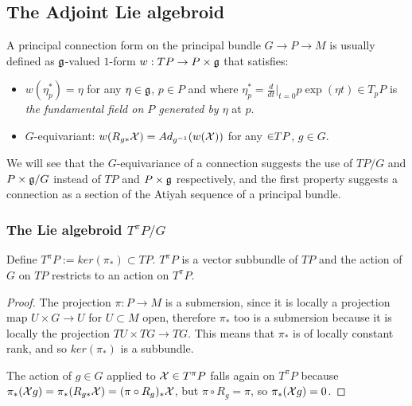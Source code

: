 \subsection{The Adjoint Lie algebroid}

A principal connection form on the principal bundle $G \to P \to M$ is usually defined as $\mathfrak{g}$-valued $1$-form  $w: TP \to P \times \mathfrak{g}$ that satisfies:

    \begin{itemize}
    
    \item $w(\eta_p^*) = \eta$ for any $\eta \in \mathfrak{g}$, $p \in P$ and where $\eta_p^* = \frac{d}{dt}\bigr|_{t = 0} p\exp(\eta t)\in T_p P$ is \emph{the fundamental field on $P$ generated by $\eta$} at $p$.
    
    \item $G$-equivariant: $w(R_{g*} \mathcal{X}) = Ad_{g^{-1}}( w(\mathcal{X}))$ for any $\mathcal{\in} TP$, $g \in G$.
    
    \end{itemize}
We will see that the $G$-equivariance of a connection suggests the use of $TP/G$ and $P \times \mathfrak{g} / G$ instead of $TP$ and $P \times \mathfrak{g}$ respectively, and the first property suggests a connection as a section of the Atiyah sequence of a principal bundle. 

\subsubsection{The Lie algebroid $T^\pi P/G$}

\begin{lemma}
Define $T^\pi P := ker(\pi_*) \subset TP$. $T^\pi P$ is a vector subbundle of $TP$ and the action of $G$ on $TP$ restricts to an action on $T^\pi P$.
\end{lemma}

\begin{proof}
The projection $\pi:P \to M$ is a submersion, since it is locally a projection map $U \times G \to U$ for $U \subset M$ open, therefore $\pi_*$ too is a submersion because it is locally the projection $TU \times TG \to TG$. This means that $\pi_*$ is of locally constant rank, and so $ker(\pi_*)$ is a subbundle.

The action of $g \in G$ applied to $\mathcal{X} \in T^\pi P$ falls again on $T^\pi P$ because $\pi_*(\mathcal{X}g) = \pi_*(R_{g*} \mathcal{X}) = (\pi \circ R_g)_* \mathcal{X}$, but $\pi \circ R_g = \pi$, so $\pi_*(\mathcal{X}g) = 0$.
\end{proof}


